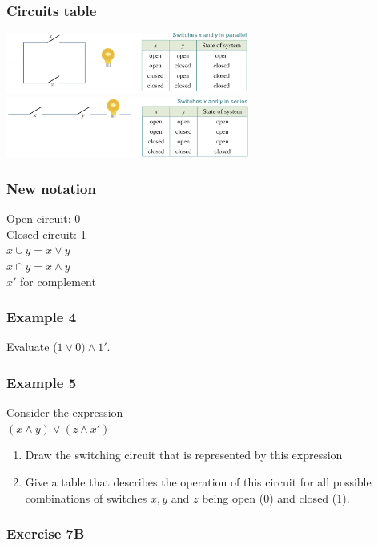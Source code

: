 \documentclass[
	11pt, %
]{beamer}
\begin{document}
\begin{frame}
    \frametitle{Circuits table}
    \begin{center}
        \includegraphics[width = 8cm]{Parallel.png}\\
        \includegraphics[width = 8cm]{Series.png}
    \end{center}
\end{frame}

\begin{frame}[t]
    \frametitle{New notation}
    Open circuit: 0\\
    Closed circuit: 1\\
    $x \cup y = x \lor y$\\
    $x \cap y = x \land y$\\
    $x'$ for complement
\end{frame}

\begin{frame}[t]
    \frametitle{Example 4}
    Evaluate ($1 \lor 0) \land 1'$.
\end{frame}

\begin{frame}[t]
    \frametitle{Example 5}
    Consider the expression\\
    $(x \land y) \lor (z \land x')$\\
    \begin{enumerate}
        \item Draw the switching circuit that is represented by this expression
        \item Give a table that describes the operation of this circuit for all possible combinations of switches $x, y$ and $z$ being open (0) and closed (1).
    \end{enumerate}
\end{frame}

\begin{frame}
    \frametitle{Exercise 7B}
\end{frame}

\end{document}
